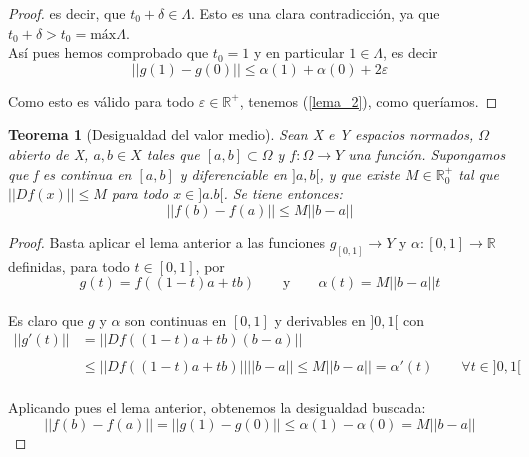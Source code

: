 \documentclass[a4paper, 12pt]{article}
\newtheorem*{teorema*}{Teorema}
\begin{document}
\begin{enumerate}[label=\textbf{\arabic*}.]
\begin{proof}
es decir, que \(t_0 + \delta \in \Lambda\). Esto es una clara contradicción, ya que \(t_0 + \delta > t_0 = \text{máx} \Lambda\). \\

Así pues hemos comprobado que \(t_0 = 1\) y en particular \(1 \in \Lambda\), es decir
\[
	||g(1) - g(0)|| \leq \alpha (1) + \alpha (0) + 2 \varepsilon
\]

Como esto es válido para todo \(\varepsilon \in \mathbb{R}^+\), tenemos (\ref{lema_2}), como queríamos.
\end{proof}

\begin{teorema*}[Desigualdad del valor medio]
Sean X e Y espacios normados, \(\Omega\) abierto de X, \(a,b \in X\) tales que \([a,b] \subset \Omega\) y \(f: \Omega \to Y\) una función. Supongamos que f es continua en \([a,b]\) y diferenciable en \(]a,b[\), y que existe \(M \in \mathbb{R}_0^+\) tal que \(||Df(x)|| \leq M\) para todo \(x \in ]a.b[\). Se tiene entonces:
\[
	||f(b) - f(a)|| \leq M ||b-a||
\]
\end{teorema*}

\begin{proof}
Basta aplicar el lema anterior a las funciones \(g_ [0,1] \to Y\) y \(\alpha: [0,1] \to \mathbb{R}\) definidas, para todo \(t \in [0,1]\), por
\[
	g(t) = f((1-t) a + tb) \qquad \text{y} \qquad \alpha (t) = M ||b-a|| t
\] \\

Es claro que \(g\) y \(\alpha\) son continuas en \([0,1]\) y derivables en \(]0,1[\) con
\[
\begin{array}{ll}
||g'(t)|| &= || Df((1-t) a + tb) (b-a)|| \\
\\
&\leq ||Df((1-t)a + tb)|| ||b-a|| \leq M ||b-a|| = \alpha' (t) \qquad \forall t \in ]0,1[
\end{array}
\] \\

Aplicando pues el lema anterior, obtenemos la desigualdad buscada:
\[
	||f(b) - f(a)|| = ||g(1)- g(0)|| \leq \alpha(1) - \alpha(0) = M ||b-a||
\]
\end{proof}

\end{enumerate}
\end{document}
